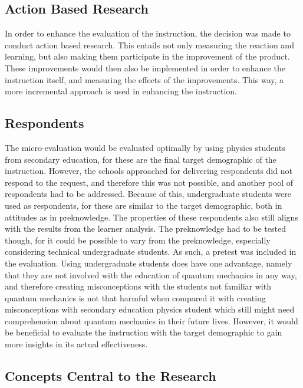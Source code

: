 \documentclass[11pt,twoside]{report} %
\begin{document}
\subsection{Action Based Research}

In order to enhance the evaluation of the instruction, the decision was made to conduct action based research. This entails not only measuring the reaction and learning, but also making them participate in the improvement of the product. These improvements would then also be implemented in order to enhance the instruction itself, and measuring the effects of the improvements. This way, a more incremental approach is used in enhancing the instruction.

\subsection{Respondents}

The micro-evaluation would be evaluated optimally by using physics students from secondary education, for these are the final target demographic of the instruction. However, the schools approached for delivering respondents did not respond to the request, and therefore this was not possible, and another pool of respondents had to be addressed. Because of this, undergraduate students were used as respondents, for these are similar to the target demographic, both in attitudes as in preknowledge. The properties of these respondents also still aligns with the results from the learner analysis. The preknowledge had to be tested though, for it could be possible to vary from the preknowledge, especially considering technical undergraduate students. As such, a pretest was included in the evaluation. Using undergraduate students does have one advantage, namely that they are not involved with the education of quantum mechanics in any way, and therefore creating misconceptions with the students not familiar with quantum mechanics is not that harmful when compared it with creating misconceptions with secondary education physics student which still might need comprehension about quantum mechanics in their future lives. However, it would be beneficial to evaluate the instruction with the target demographic to gain more insights in its actual effectiveness.

\subsection{Concepts Central to the Research}
\label{subsec:evaconcepts}
\end{document}
